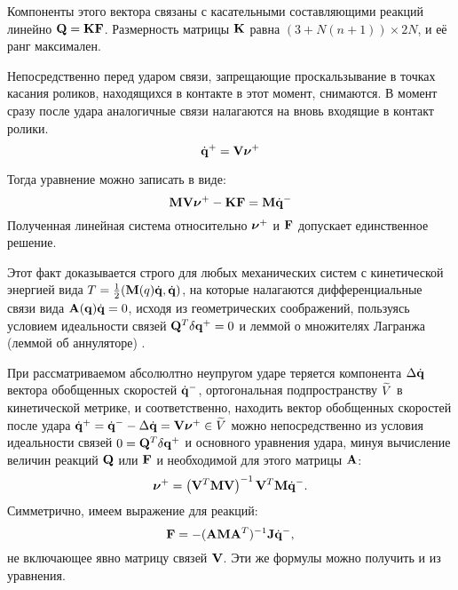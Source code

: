 Компоненты этого вектора связаны с касательными составляющими реакций линейно $\mathbf{Q} = \mathbf{K} \mathbf{F}$.
%
Размерность матрицы $\mathbf{K}$ равна $(3 + N(n+1)) \times 2N$, и её ранг максимален.

Непосредственно перед ударом связи, запрещающие проскальзывание в точках касания роликов, находящихся в контакте в этот момент, снимаются.
В момент сразу после удара аналогичные связи налагаются на вновь входящие в контакт ролики.
\begin{equation*}
\dot{\mathbf{q}}^+ = \mathbf{V}\boldsymbol{\mathbf{\nu}}^+
\end{equation*}

Тогда уравнение можно записать в виде:
\begin{equation}\label{eq:udar_mat}
\mathbf{M}\mathbf{V}\boldsymbol{\mathbf{\nu}}^+ - \mathbf{K}\mathbf{F} = \mathbf{M}\dot{\mathbf{q}}^-
\end{equation}
Полученная линейная система относительно $\boldsymbol{\mathbf{\nu}}^+$ и $\mathbf{F}$ допускает единственное решение.

Этот факт доказывается строго для любых механических систем с кинетической энергией вида $T = \frac{1}{2}(\mathbf{M}(q)\dot{\mathbf{q}}, \dot{\mathbf{q}})$, на которые налагаются дифференциальные связи вида $\mathbf{A}(\mathbf{q})\dot{\mathbf{q}} = 0$, исходя из геометрических соображений, пользуясь условием идеальности связей $\mathbf{Q}^T \delta\mathbf{q}^+ = 0$ и леммой о множителях Лагранжа (леммой об аннуляторе) \cite{KarapetyanKugushev2010}.

При рассматриваемом абсолюлтно неупругом ударе теряется компонента $\Delta\dot{\mathbf{q}}$ вектора обобщенных скоростей $\dot{\mathbf{q}}^-$, ортогональная подпространству $\widetilde{V}$ в кинетической метрике, и соответственно, находить вектор обобщенных скоростей после удара $\dot{\mathbf{q}}^+ = \dot{\mathbf{q}}^- - \Delta\dot{\mathbf{q}} = \mathbf{V}\boldsymbol{\mathbf{\nu}}^+ \in \widetilde{V}$ можно непосредственно из условия идеальности связей $0 = \mathbf{Q}^T \delta\mathbf{q}^+$ и основного уравнения удара, минуя вычисление величин реакций $\mathbf{Q}$ или $\mathbf{F}$ и необходимой для этого матрицы $\mathbf{A}$:
\begin{equation*}
\boldsymbol{\mathbf{\nu}}^+ = \left( \mathbf{V}^T\mathbf{M}\mathbf{V} \right)^{-1}\mathbf{V}^T\mathbf{M}\dot{\mathbf{q}}^-.
\end{equation*}
Симметрично, имеем выражение для реакций:
\begin{equation*}
    \mathbf{F} = -(\mathbf{A} \mathbf{M} \mathbf{A}^T)^{-1}\mathbf{J}\dot{\mathbf{q}}^-,
\end{equation*}
не включающее явно матрицу связей $\mathbf{V}$. Эти же формулы можно получить и из уравнения.

